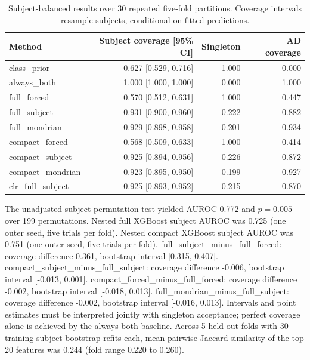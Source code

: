 \begin{table}
\caption{Subject-balanced results over 30 repeated five-fold partitions. Coverage intervals resample subjects, conditional on fitted predictions.}
\centering\small
\begin{tabular}{lrrr}
\toprule
Method & Subject coverage [95\% CI] & Singleton & AD coverage\\
\midrule
class\_prior & 0.627 [0.529, 0.716] & 1.000 & 0.000\\
always\_both & 1.000 [1.000, 1.000] & 0.000 & 1.000\\
full\_forced & 0.570 [0.512, 0.631] & 1.000 & 0.447\\
full\_subject & 0.931 [0.900, 0.960] & 0.222 & 0.882\\
full\_mondrian & 0.929 [0.898, 0.958] & 0.201 & 0.934\\
compact\_forced & 0.568 [0.509, 0.633] & 1.000 & 0.414\\
compact\_subject & 0.925 [0.894, 0.956] & 0.226 & 0.872\\
compact\_mondrian & 0.923 [0.895, 0.950] & 0.199 & 0.927\\
clr\_full\_subject & 0.925 [0.893, 0.952] & 0.215 & 0.870\\
\bottomrule
\end{tabular}
\end{table}
The unadjusted subject permutation test yielded AUROC 0.772 and $p=0.005$ over 199 permutations.
Nested full XGBoost subject AUROC was 0.725 (one outer seed, five trials per fold).
Nested compact XGBoost subject AUROC was 0.751 (one outer seed, five trials per fold).
full\_subject\_minus\_full\_forced: coverage difference 0.361, bootstrap interval [0.315, 0.407].
compact\_subject\_minus\_full\_subject: coverage difference -0.006, bootstrap interval [-0.013, 0.001].
compact\_forced\_minus\_full\_forced: coverage difference -0.002, bootstrap interval [-0.018, 0.013].
full\_mondrian\_minus\_full\_subject: coverage difference -0.002, bootstrap interval [-0.016, 0.013].
Intervals and point estimates must be interpreted jointly with singleton acceptance; perfect coverage alone is achieved by the always-both baseline.
Across 5 held-out folds with 30 training-subject bootstrap refits each, mean pairwise Jaccard similarity of the top 20 features was 0.244 (fold range 0.220 to 0.260).
